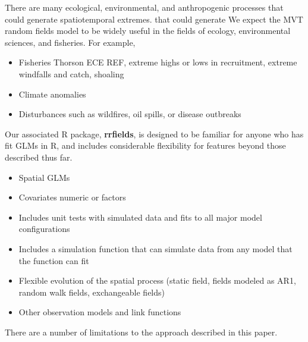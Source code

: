 \documentclass[12pt,english]{article}
\begin{document}
\begin{spacing}{1.3}
\begin{itemize}
\end{itemize}

There are many ecological, environmental, and anthropogenic processes that could
generate spatiotemporal extremes.  that could generate We expect the MVT random
fields model to be widely useful in the fields of ecology, environmental
sciences, and fisheries. For example,

\begin{itemize}

  \item Fisheries Thorson ECE REF, extreme highs or lows in recruitment, extreme
    windfalls and catch, shoaling

  \item Climate anomalies

  \item Disturbances such as wildfires, oil spills, or disease outbreaks

\end{itemize}

Our associated R package, \textbf{rrfields}, is designed to be familiar for
anyone who has fit GLMs in R, and includes considerable flexibility for features
beyond those described thus far.

\begin{itemize}

  \item Spatial GLMs

  \item Covariates numeric or factors

  \item Includes unit tests with simulated data and fits to all major model
    configurations

  \item Includes a simulation function that can simulate data from any model
    that the function can fit

  \item Flexible evolution of the spatial process (static field, fields modeled
    as AR1, random walk fields, exchangeable fields)

  \item Other observation models and link functions

\end{itemize}

There are a number of limitations to the approach described in this paper.

\begin{itemize}


\end{itemize}
\end{spacing}
\end{document}
